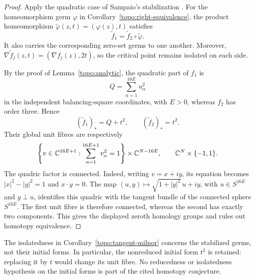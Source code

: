 \begin{proof}
Apply the quadratic case of Sampaio's stabilization
\cite[proof of Proposition~2.3]{Sampaio2025Milnor}.
For the homeomorphism germ $\varphi$ in
Corollary~\ref{topo:right-equivalence}, the product homeomorphism
$\widetilde\varphi(z,t)=(\varphi(z),t)$ satisfies
\[
 \widetilde f_1=\widetilde f_2\circ\widetilde\varphi.
\]
It also carries the corresponding zero-set germs to one another. Moreover,
$\nabla\widetilde f_j(z,t)=(\nabla f_j(z),2t)$, so the critical point
remains isolated on each side.

By the proof of Lemma~\ref{topo:analytic}, the quadratic part of $f_1$ is
\[
 Q=\sum_{\alpha=1}^{16E}u_\alpha^2
\]
in the independent balancing-square coordinates, with $E>0$, whereas
$f_2$ has order three. Hence
\[
 (\widetilde f_1)_*=Q+t^2,\qquad
 (\widetilde f_2)_*=t^2.
\]
Their global unit fibres are respectively
\[
 \left\{v\in\mathbb C^{16E+1}:
       \sum_{\alpha=1}^{16E+1}v_\alpha^2=1\right\}
       \times\mathbb C^{N-16E},
 \qquad
 \mathbb C^N\times\{-1,1\}.
\]
The quadric factor is connected. Indeed, writing $v=x+iy$, its equation
becomes $|x|^2-|y|^2=1$ and $x\cdot y=0$. The map
$(u,y)\mapsto\sqrt{1+|y|^2}\,u+iy$, with
$u\in S^{16E}$ and $y\perp u$, identifies this quadric with the tangent
bundle of the connected sphere $S^{16E}$. The first unit fibre is therefore
connected, whereas the second has exactly two components. This gives the
displayed zeroth homology groups and rules out homotopy equivalence.
\end{proof}

The isolatedness in Corollary~\ref{topo:tangent-milnor} concerns the
stabilized germs, not their initial forms. In particular, the nonreduced
initial form $t^2$ is retained: replacing it by $t$ would change its unit
fibre. No reducedness or isolatedness hypothesis on the initial forms is
part of the cited homotopy conjecture.
